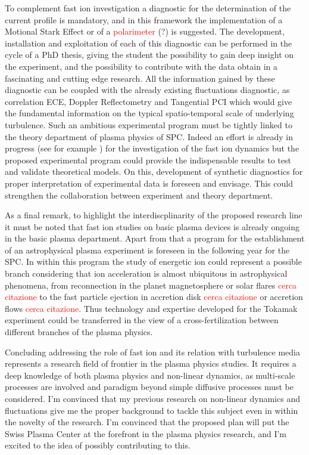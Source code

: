\documentclass[12pt,a4paper]{article}
\begin{document}
To complement fast ion investigation a diagnostic for the
determination of the current profile is mandatory, and in this
framework the implementation of a Motional Stark Effect or of a
\textcolor{red}{polarimeter} (?) is suggested.
The development, installation and exploitation of each of this
diagnostic can be performed in the cycle of a PhD thesis, giving the
student the possibility to gain deep insight on the experiment, and
the possibility to contribute with the data obtain in a fascinating
and cutting edge research. All the information gained by these
diagnostic can be coupled with the already existing fluctuations
diagnostic, as correlation ECE, Doppler Reflectometry and Tangential
PCI which would give the fundamental information on the typical
spatio-temporal scale of underlying turbulence. Such an ambitious
experimental program must be tightly linked to the theory department
of plasma physics of SPC. Indeed an effort is already in progress (see
for example \cite{Albergante:2011bj,Pfefferle:2014bk}) for
the investigation of the fast ion dynamics but the proposed
experimental program could provide the indispensable results to test
and validate theoretical models. On this,  development of synthetic
diagnostics for proper interpretation of experimental data is foreseen
and envisage. This could strengthen the collaboration between
experiment and theory department. 

As a final remark, to highlight the interdiscplinarity of the proposed
research line it must be noted that fast ion studies on basic
plasma devices is already ongoing in the basic plasma
department. Apart from that a program for the establishment of an
astrophysical plasma experiment is foreseen in the following year for
the SPC. In
within this program the study of energetic ion could represent a
possible branch considering that ion acceleration is almost ubiquitous in
astrophysical phenomena,  from reconnection in the planet
magnetosphere \cite{space-science-review} or solar flares
\textcolor{red}{cerca citazione} to the fast particle
ejection in accretion disk \textcolor{red}{cerca citazione} or
accretion flows \textcolor{red}{cerca citazione}. Thus
technology and expertise developed for the Tokamak experiment could be
transferred in the view of a cross-fertilization between different
branches of the plasma physics.

Concluding addressing the role of fast ion and its relation with
turbulence media represents a research field of frontier in the
plasma physics studies. It requires a deep knowledge of both plasma
physics and non-linear dynamics, as multi-scale processes are involved
and paradigm beyond simple diffusive processes must be considered. I'm
convinced that my previous research on non-linear dynamics and
fluctuations give me the proper background to tackle this
subject even in within the novelty of the research. I'm convinced that
the proposed plan will put the Swiss Plasma Center at the forefront in
the plasma physics research, and I'm excited to the idea of possibly
contributing to this.
\clearpage
\printbibliography[title=Personal publications cited,notkeyword=others, prefixnumbers={A}, resetnumbers=true]
\printbibliography[title=Other Sources, keyword=others, prefixnumbers={B}, resetnumbers=true]
\end{document}
